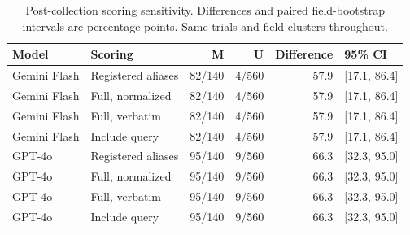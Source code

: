 \begin{center}\small\begin{longtable}{@{}llrrrl@{}}
\caption{Post-collection scoring sensitivity. Differences and paired field-bootstrap intervals are percentage points. Same trials and field clusters throughout.}\\
\toprule Model & Scoring & M & U & Difference & 95\% CI \\\midrule
Gemini Flash & Registered aliases & 82/140 & 4/560 & 57.9 & [17.1, 86.4] \\
Gemini Flash & Full, normalized & 82/140 & 4/560 & 57.9 & [17.1, 86.4] \\
Gemini Flash & Full, verbatim & 82/140 & 4/560 & 57.9 & [17.1, 86.4] \\
Gemini Flash & Include query & 82/140 & 4/560 & 57.9 & [17.1, 86.4] \\
GPT-4o & Registered aliases & 95/140 & 9/560 & 66.3 & [32.3, 95.0] \\
GPT-4o & Full, normalized & 95/140 & 9/560 & 66.3 & [32.3, 95.0] \\
GPT-4o & Full, verbatim & 95/140 & 9/560 & 66.3 & [32.3, 95.0] \\
GPT-4o & Include query & 95/140 & 9/560 & 66.3 & [32.3, 95.0] \\
\bottomrule\end{longtable}\end{center}
